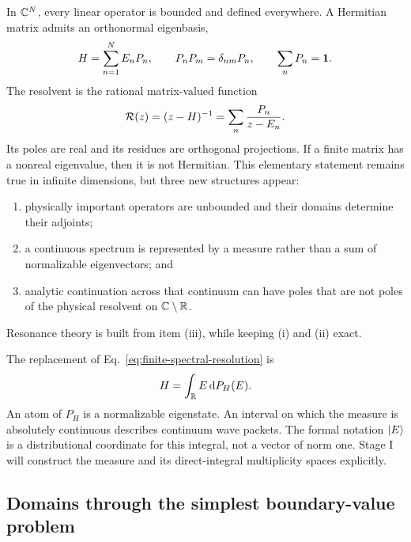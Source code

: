 In $\mathbb{C}^N$, every linear operator is bounded and defined everywhere.
A Hermitian matrix admits an orthonormal eigenbasis,
\begin{equation}
  H=\sum_{n=1}^N E_n P_n,
  \qquad P_nP_m=\delta_{nm}P_n,
  \qquad \sum_nP_n=\mathbf{1} .
  \label{eq:finite-spectral-resolution}
\end{equation}
The resolvent is the rational matrix-valued function
\begin{equation}
  \mathcal{R}(z)=(z-H)^{-1}=\sum_n\frac{P_n}{z-E_n}.
  \label{eq:finite-resolvent}
\end{equation}
Its poles are real and its residues are orthogonal projections.  If a finite
matrix has a nonreal eigenvalue, then it is not Hermitian.  This elementary
statement remains true in infinite dimensions, but three new structures
appear:
\begin{enumerate}[label=(\roman*)]
  \item physically important operators are unbounded and their domains
  determine their adjoints;
  \item a continuous spectrum is represented by a measure rather than a sum
  of normalizable eigenvectors; and
  \item analytic continuation across that continuum can have poles that are
  not poles of the physical resolvent on $\mathbb{C}\setminus\mathbb{R}$.
\end{enumerate}
Resonance theory is built from item (iii), while keeping (i) and (ii) exact.

The replacement of Eq.~\eqref{eq:finite-spectral-resolution} is
\begin{equation}
  H=\int_{\mathbb{R}} E\,\mathrm{d} P_H(E).
  \label{eq:spectral-theorem-preview}
\end{equation}
An atom of $P_H$ is a normalizable eigenstate.  An interval on which the
measure is absolutely continuous describes continuum wave packets.  The
formal notation $\lvert E \rangle$ is a distributional coordinate for this integral,
not a vector of norm one.  Stage I will construct the measure and its direct-integral multiplicity spaces explicitly.

\subsection{Domains through the simplest boundary-value problem}
\label{subsec:momentum-interval-domain}

